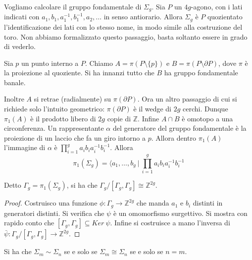 \begin{ex}
    Vogliamo calcolare il gruppo fondamentale di $\Sigma_g$. Sia $P$ un $4g$-agono, con i lati indicati con $a_1, b_1, a_1^{-1}, b_1^{-1}, a_2, \dots$ in senso antiorario.
    Allora $\Sigma_g$ \`e $P$ quozientato l'identificazione dei lati con lo stesso nome, in modo simile alla costruzione del toro. Non abbiamo formalizzato questo passaggio, basta soltanto essere in grado di vederlo.

    Sia $p$ un punto interno a $P$. Chiamo $A = \pi(P\setminus\{p\})$ e $B=\pi(P\setminus\partial P)$, dove $\pi$ \`e la proiezione al quoziente.  Si ha innanzi tutto che $B$ ha gruppo fondamentale banale.

    Inoltre $A$ si retrae (radialmente) su $\pi(\partial P)$. Ora un altro passaggio di cui si richiede solo l'intuito geometrico: $\pi(\partial P)$ \`e il wedge di $2g$ cerchi. Dunque $\pi_1(A)$ \`e il prodotto libero di $2g$ copie di $\mathbb{Z}$. Infine $A\cap B$ \`e omotopo a una circonferenza. Un rappresentante $\alpha$ del generatore del gruppo fondamentale \`e la proiezione di un laccio che fa un giro intorno a $p$.
    Allora dentro $\pi_1(A)$ l'immagine di $\alpha$ \`e $\prod_{i=1}^g a_ib_ia_i^{-1}b_i^{-1}$.
    Allora
    \[
        \pi_1(\Sigma_g)=\langle a_1, \dots, b_g\ |\ \prod_{i=1}^ga_ib_ia_i^{-1}b_i^{-1}
    \]
\end{ex}
\begin{prop}
    Detto $\Gamma_g = \pi_1(\Sigma_g)$, si ha che $\Gamma_g /[\Gamma_g, \Gamma_g] \cong \mathbb{Z}^{2g}$.
\end{prop}
\begin{proof}
    Costruisco una funzione $\phi\colon \Gamma_g\longrightarrow \mathbb{Z}^{2g}$ che manda $a_1$ e $b_i$ distinti in generatori distinti. Si verifica che $\psi$ \`e un omomorfismo surgettivo. Si mostra con rapido conto che $[\Gamma_g, \Gamma_g]\subseteq Ker\ \psi$. Infine si costruisce a mano l'inversa di $\bar{\psi}\colon \Gamma_g /[\Gamma_g, \Gamma_g]\rightarrow \mathbb{Z}^{2g}$.
\end{proof}

\begin{cor}
    Si ha che $\Sigma_m \sim \Sigma_n$ se e solo se $\Sigma_m \cong \Sigma_n$ se e solo se $n=m$.
\end{cor}
